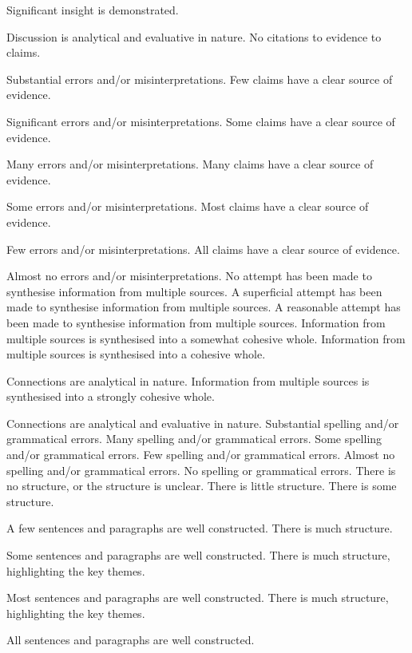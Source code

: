 \documentclass{../../fal_assignment}
\begin{document}
\begin{markingrubric}
        \grade		Significant insight is demonstrated.
        \par		Discussion is analytical and evaluative in nature.
%
        \grade\fail 	No citations to evidence to claims.
        \par 		Substantial errors and/or misinterpretations.
        \grade 		Few claims have a clear source of evidence.
        \par 		Significant errors and/or misinterpretations.
        \grade 		Some claims have a clear source of evidence.
        \par 		Many errors and/or misinterpretations.
        \grade 		Many claims have a clear source of evidence.
        \par 		Some errors and/or misinterpretations.
        \grade 		Most claims have a clear source of evidence.
        \par 		Few errors and/or misinterpretations.
        \grade 		All claims have a clear source of evidence.
        \par 		Almost no errors and/or misinterpretations.
%
        \grade\fail No attempt has been made to synthesise information from multiple sources.
        \grade		A superficial attempt has been made to synthesise information from multiple sources.
        \grade		A reasonable attempt has been made to synthesise information from multiple sources.
        \grade		Information from multiple sources is synthesised into a somewhat cohesive whole.
        \grade		Information from multiple sources is synthesised into a cohesive whole.
        \par		Connections are analytical in nature.
        \grade		Information from multiple sources is synthesised into a strongly cohesive whole.
        \par		Connections are analytical and evaluative in nature.
%
        \grade\fail 	Substantial spelling and/or grammatical errors.
        \grade 		Many spelling and/or grammatical errors.
        \grade 		Some spelling and/or grammatical errors.  
        \grade 		Few spelling and/or grammatical errors.
        \grade 		Almost no spelling and/or grammatical errors.
        \grade 		No spelling or grammatical errors.
%
        \grade\fail 	There is no structure, or the structure is unclear.
        \grade 		There is little structure.
        \grade 		There is some structure.
        \par 		A few sentences and paragraphs are well constructed.
        \grade 		There is much structure.
        \par 		Some sentences and paragraphs are well constructed.
        \grade 		There is much structure, highlighting the key themes.
        \par 		Most sentences and paragraphs are well constructed.
        \grade 		There is much structure, highlighting the key themes.
        \par 		All sentences and paragraphs are well constructed.
\end{markingrubric}
\end{document}
